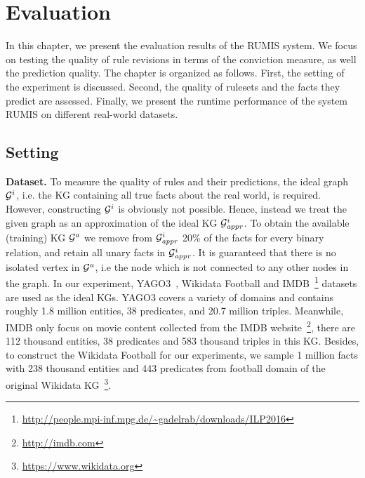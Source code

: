 \chapter{Evaluation}
\label{chap:eval}

In this chapter, we present the evaluation results of the RUMIS system. We focus on testing the quality of rule revisions in terms of the conviction measure, as well the prediction quality. The chapter is organized as follows. First, the setting of the experiment is discussed. Second, the quality of rulesets and the facts they predict are assessed. Finally, we present the runtime performance of the system RUMIS on different real-world datasets.

\section{Setting}

\textbf{Dataset.} To measure the quality of rules and their predictions, the ideal graph $\mathcal{G}^i$, i.e. the KG containing all true facts about the real world, is required. However, constructing $\mathcal{G}^i$ is obviously not possible. Hence, instead we treat the given graph as an approximation of the ideal KG $\mathcal{G}^i_{\mathit{appr}}$. To obtain the available (training) KG $\mathcal{G}^a$ we remove from $\mathcal{G}^i_{\mathit{appr}}$ 20\% of the facts for every binary relation, and retain all unary facts in $\mathcal{G}^i_{\mathit{appr}}$. It is guaranteed that there is no isolated vertex in $\mathcal{G}^a$, i.e the node which is not connected to any other nodes in the graph. In our experiment, YAGO3~\cite{ref28}, Wikidata Football and IMDB~\footnote{\url{http://people.mpi-inf.mpg.de/~gadelrab/downloads/ILP2016}} datasets are used as the ideal KGs. YAGO3 covers a variety of domains and contains roughly 1.8 million entities, 38 predicates, and 20.7 million triples. Meanwhile, IMDB only focus on movie content collected from the IMDB website~\footnote{\url{http://imdb.com}}, there are 112 thousand entities, 38 predicates and 583 thousand triples in this KG. Besides, to construct the Wikidata Football for our experiments, we sample 1 million facts with 238 thousand entities and 443 predicates from football domain of the original Wikidata KG~\footnote{\url{https://www.wikidata.org}}. %

